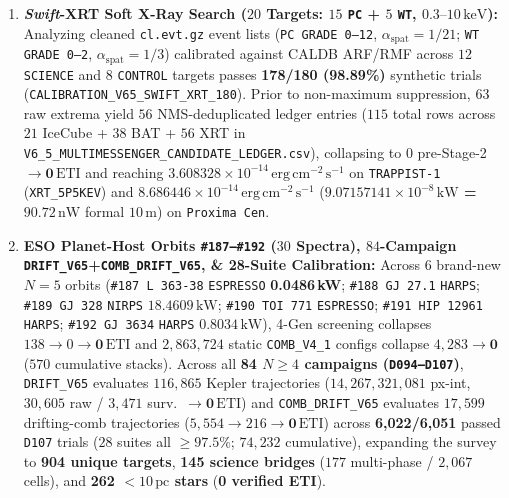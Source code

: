 \documentclass[twocolumn,10pt]{article}
\begin{document}
\begin{enumerate}
  \item \textbf{\textit{Swift}-XRT Soft X-Ray Search ($20$ Targets: $15$ \texttt{PC} + $5$ \texttt{WT}, $0.3\text{--}10\,\mathrm{keV}$):} Analyzing cleaned \texttt{cl.evt.gz} event lists (\texttt{PC GRADE 0--12}, $\alpha_{\mathrm{spat}}=1/21$; \texttt{WT GRADE 0--2}, $\alpha_{\mathrm{spat}}=1/3$) calibrated against CALDB ARF/RMF \cite{Burrows2005} across $12$ \texttt{SCIENCE} and $8$ \texttt{CONTROL} targets passes \textbf{178/180 (98.89\%)} synthetic trials (\texttt{CALIBRATION\_V65\_SWIFT\_XRT\_180}). Prior to non-maximum suppression, $63$ raw extrema yield $56$ NMS-deduplicated ledger entries ($115$ total rows across $21$ IceCube + $38$ BAT + $56$ XRT in \texttt{V6\_5\_MULTIMESSENGER\_CANDIDATE\_LEDGER.csv}), collapsing to $0$ pre-Stage-2 $\rightarrow \mathbf{0\,\mathrm{ETI}}$ and reaching $3.608328\times 10^{-14}\,\mathrm{erg\,cm^{-2}\,s^{-1}}$ on \texttt{TRAPPIST-1} (\texttt{XRT\_5P5KEV}) and $8.686446\times 10^{-14}\,\mathrm{erg\,cm^{-2}\,s^{-1}}$ (\textbf{$9.07157141\times 10^{-8}\,\mathrm{kW}$ = $90.72\,\mathrm{nW}$} formal $10\,\text{m}$) on \texttt{Proxima Cen}.
  \item \textbf{ESO Planet-Host Orbits \texttt{\#187--\#192} ($30$ Spectra), $84$-Campaign \texttt{DRIFT\_V65}+\texttt{COMB\_DRIFT\_V65}, \& 28-Suite Calibration:} Across $6$ brand-new $N=5$ orbits (\texttt{\#187 L\,363-38} \texttt{ESPRESSO} \textbf{0.0486\,kW}; \texttt{\#188 GJ\,27.1} \texttt{HARPS}; \texttt{\#189 GJ\,328} \texttt{NIRPS} $18.4609\,\mathrm{kW}$; \texttt{\#190 TOI\,771} \texttt{ESPRESSO}; \texttt{\#191 HIP\,12961} \texttt{HARPS}; \texttt{\#192 GJ\,3634} \texttt{HARPS} $0.8034\,\mathrm{kW}$), 4-Gen screening collapses $138\rightarrow 0\rightarrow \mathbf{0\,\mathrm{ETI}}$ and $2{,}863{,}724$ static \texttt{COMB\_V4\_1} configs collapse $4{,}283\rightarrow \mathbf{0}$ ($570$ cumulative stacks). Across all \textbf{84 $N\ge 4$ campaigns (\texttt{D094--D107})}, \texttt{DRIFT\_V65} evaluates $116{,}865$ Kepler trajectories ($14{,}267{,}321{,}081$ px-int, $30{,}605$ raw / $3{,}471$ surv.\ $\rightarrow \mathbf{0\,\mathrm{ETI}}$) and \texttt{COMB\_DRIFT\_V65} evaluates $17{,}599$ drifting-comb trajectories ($5{,}554\rightarrow 216\rightarrow \mathbf{0\,\mathrm{ETI}}$) across \textbf{6,022/6,051} passed \texttt{D107} trials ($28$ suites all $\ge 97.5\%$; $74{,}232$ cumulative), expanding the survey to \textbf{904 unique targets}, \textbf{145 science bridges} ($177$ multi-phase / $2{,}067$ cells), and \textbf{262 $<10\,\text{pc}$ stars} (\textbf{0 verified ETI}).
\end{enumerate}
\end{document}
